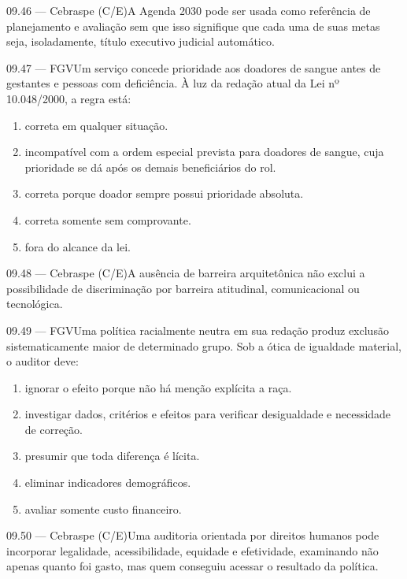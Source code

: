 \begin{questao}{ 09.46 — Cebraspe (C/E)}A Agenda 2030 pode ser usada como referência de planejamento e avaliação sem que isso signifique que cada uma de suas metas seja, isoladamente, título executivo judicial automático.\end{questao}
\begin{questao}{ 09.47 — FGV}Um serviço concede prioridade aos doadores de sangue antes de gestantes e pessoas com deficiência. À luz da redação atual da Lei nº 10.048/2000, a regra está:\begin{enumerate}[label=\Alph*)]\item correta em qualquer situação.\item incompatível com a ordem especial prevista para doadores de sangue, cuja prioridade se dá após os demais beneficiários do rol.\item correta porque doador sempre possui prioridade absoluta.\item correta somente sem comprovante.\item fora do alcance da lei.\end{enumerate}\end{questao}
\begin{questao}{ 09.48 — Cebraspe (C/E)}A ausência de barreira arquitetônica não exclui a possibilidade de discriminação por barreira atitudinal, comunicacional ou tecnológica.\end{questao}
\begin{questao}{ 09.49 — FGV}Uma política racialmente neutra em sua redação produz exclusão sistematicamente maior de determinado grupo. Sob a ótica de igualdade material, o auditor deve:\begin{enumerate}[label=\Alph*)]\item ignorar o efeito porque não há menção explícita a raça.\item investigar dados, critérios e efeitos para verificar desigualdade e necessidade de correção.\item presumir que toda diferença é lícita.\item eliminar indicadores demográficos.\item avaliar somente custo financeiro.\end{enumerate}\end{questao}
\begin{questao}{ 09.50 — Cebraspe (C/E)}Uma auditoria orientada por direitos humanos pode incorporar legalidade, acessibilidade, equidade e efetividade, examinando não apenas quanto foi gasto, mas quem conseguiu acessar o resultado da política.\end{questao}
